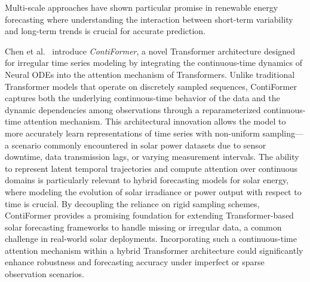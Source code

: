 \documentclass[12pt]{uomthesis}
\begin{document}
Multi-scale approaches have shown particular promise in renewable energy forecasting where understanding the interaction between short-term variability and long-term trends is crucial for accurate prediction.

Chen et al.\ \cite{chen2023contiformer} introduce \textit{ContiFormer}, a novel Transformer architecture designed for irregular time series modeling by integrating the continuous-time dynamics of Neural ODEs into the attention mechanism of Transformers. Unlike traditional Transformer models that operate on discretely sampled sequences, ContiFormer captures both the underlying continuous-time behavior of the data and the dynamic dependencies among observations through a reparameterized continuous-time attention mechanism. This architectural innovation allows the model to more accurately learn representations of time series with non-uniform sampling—a scenario commonly encountered in solar power datasets due to sensor downtime, data transmission lags, or varying measurement intervals. The ability to represent latent temporal trajectories and compute attention over continuous domains is particularly relevant to hybrid forecasting models for solar energy, where modeling the evolution of solar irradiance or power output with respect to time is crucial. By decoupling the reliance on rigid sampling schemes, ContiFormer provides a promising foundation for extending Transformer-based solar forecasting frameworks to handle missing or irregular data, a common challenge in real-world solar deployments. Incorporating such a continuous-time attention mechanism within a hybrid Transformer architecture could significantly enhance robustness and forecasting accuracy under imperfect or sparse observation scenarios.
\end{document}
